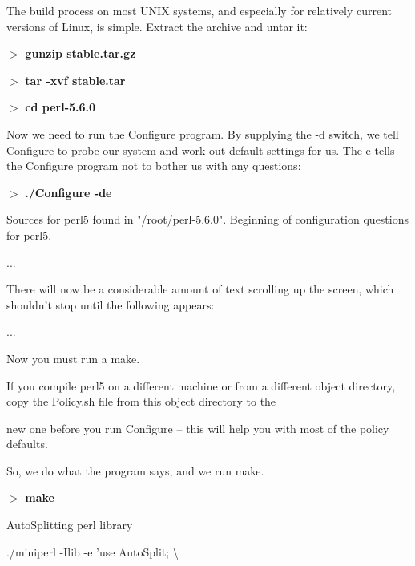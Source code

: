 \documentclass[a4paper,11pt]{book}
\begin{document}
\noindent 

\noindent The build process on most UNIX systems, and especially for relatively current versions of Linux, is simple. Extract the archive and untar it:

\noindent 

\noindent $>$ \textbf{gunzip stable.tar.gz}

\noindent $>$ \textbf{tar -xvf stable.tar}

\noindent $>$ \textbf{cd perl-5.6.0}

\noindent 

\noindent Now we need to run the Configure program. By supplying the -d switch, we tell Configure to probe our system and work out default settings for us. The e tells the Configure program not to bother us with any questions:

\noindent 

\noindent $>$ \textbf{./Configure -de}

\noindent 

\noindent Sources for perl5 found in "/root/perl-5.6.0". Beginning of configuration questions for perl5.

\noindent ...

\noindent 

\noindent There will now be a considerable amount of text scrolling up the screen, which shouldn't stop until the following appears:

\noindent 

\noindent ...

\noindent 

\noindent Now you must run a make.

\noindent 

\noindent If you compile perl5 on a different machine or from a different object directory, copy the Policy.sh file from this object directory to the

\noindent new one before you run Configure -- this will help you with most of the policy defaults.

\noindent 

\noindent 

\noindent So, we do what the program says, and we run make.

\noindent 

\noindent $>$ \textbf{make}

\noindent AutoSplitting perl library

\noindent ./miniperl -Ilib -e 'use AutoSplit; \textbackslash 
\end{document}
